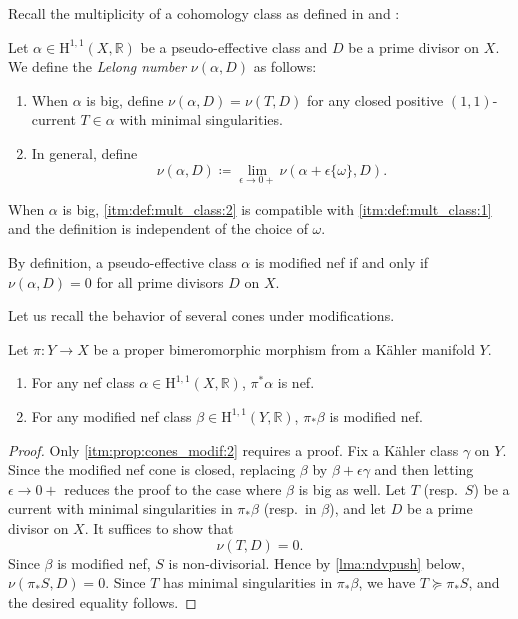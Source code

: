 Recall the multiplicity of a cohomology class as defined in \cite[Section~2.1.3]{Bou02} and \cite[Definition~14.4.1 and Proposition~14.4.2]{FPT}:
\begin{definition}\label{def:mult_class}
    Let $\alpha\in \mathrm{H}^{1,1}(X,\mathbb{R})$ be a pseudo-effective class and $D$ be a prime divisor on $X$. We define the \emph{Lelong number} $\nu(\alpha,D)$ as follows:
    \begin{enumerate}
        \item\label{itm:def:mult_class:1} When $\alpha$ is big, define $\nu(\alpha,D)=\nu(T,D)$ for any closed positive $(1,1)$-current $T\in \alpha$ with minimal singularities.
        \item\label{itm:def:mult_class:2} In general, define
        \[
        \nu(\alpha,D)\coloneqq \lim_{\epsilon\to 0+}\nu(\alpha+\epsilon \{\omega\},D).
        \]
    \end{enumerate}
\end{definition}
When $\alpha$ is big, \ref{itm:def:mult_class:2} is compatible with \ref{itm:def:mult_class:1} and the definition is independent of the choice of $\omega$.

By definition, a pseudo-effective class $\alpha$ is modified nef if and only if $\nu(\alpha,D)=0$ for all prime divisors $D$ on $X$.


Let us recall the behavior of several cones under modifications.
\begin{proposition}\label{prop:cones_modif}
    Let $\pi\colon Y\rightarrow X$ be a proper bimeromorphic morphism from a Kähler manifold $Y$.
    \begin{enumerate}
        \item\label{itm:prop:cones_modif:1} For any nef class $\alpha\in \mathrm{H}^{1,1}(X,\mathbb{R})$, $\pi^*\alpha$ is nef.
        \item\label{itm:prop:cones_modif:2} For any modified nef class $\beta\in \mathrm{H}^{1,1}(Y,\mathbb{R})$, $\pi_*\beta$ is modified nef.
    \end{enumerate}
\end{proposition}

\begin{proof}
    Only \ref{itm:prop:cones_modif:2} requires a proof. Fix a Kähler class $\gamma$ on $Y$. Since the modified nef cone is closed, replacing $\beta$ by $\beta+\epsilon\gamma$ and then letting $\epsilon\to 0+$ reduces the proof to the case where $\beta$ is big as well. Let $T$ (resp.\ $S$) be a current with minimal singularities in $\pi_*\beta$ (resp.\ in $\beta$), and let $D$ be a prime divisor on $X$. It suffices to show that
    \[
    \nu(T,D)=0.
    \]
    Since $\beta$ is modified nef, $S$ is non-divisorial. Hence by \cref{lma:ndvpush} below, $\nu(\pi_*S,D)=0$. Since $T$ has minimal singularities in $\pi_*\beta$, we have $T\succeq \pi_*S$, and the desired equality follows.
\end{proof}

